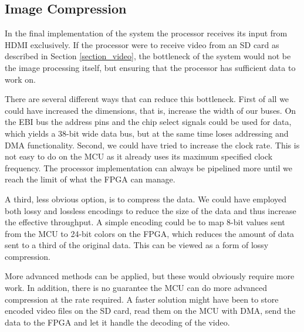 \subsection{Image Compression}

In the final implementation of the system the processor receives its input from HDMI exclusively.
If the processor were to receive video from an SD card as described in Section \ref{section_video}, the bottleneck of the system would not be the image processing itself, but ensuring that the processor has sufficient data to work on.

There are several different ways that can reduce this bottleneck. First of all we could have increased the dimensions, that is, increase the width of our buses. On the EBI bus the address pins and the chip select signals could be used for data, which yields a 38-bit wide data bus, but at the same time loses addressing and DMA functionality. Second, we could have tried to increase the clock rate. This is not easy to do on the MCU as it already uses its maximum specified clock frequency. The processor implementation can always be pipelined more until we reach the limit of what the FPGA can manage.

A third, less obvious option, is to compress the data. We could have employed both lossy and lossless encodings to reduce the size of the data and thus increase the effective throughput. A simple encoding could be to map 8-bit values sent from the MCU to 24-bit colors on the FPGA, which reduces the amount of data sent to a third of the original data. This can be viewed as a form of lossy compression.

More advanced methods can be applied, but these would obviously require more work.
In addition, there is no guarantee the MCU can do more advanced compression at the rate required.
A faster solution might have been to store encoded video files on the SD card, read them on the MCU with DMA, send the data to the FPGA and let it handle the decoding of the video. 
